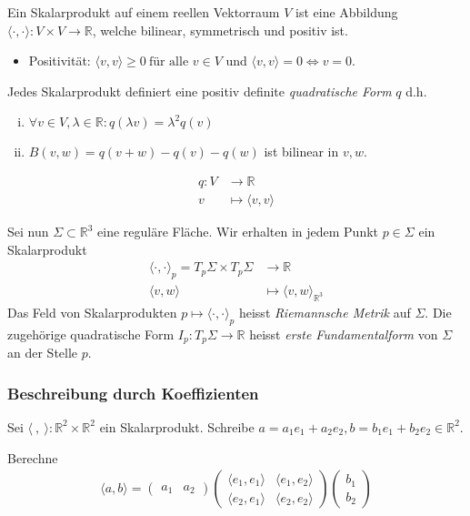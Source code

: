 \documentclass[../main.tex]{subfiles}
\begin{document}
\begin{recall}
Ein Skalarprodukt auf einem reellen Vektorraum $V$ ist eine Abbildung $\langle \cdot , \cdot \rangle : V \times V \to \mathbb{R}$, welche bilinear, symmetrisch und positiv ist.
\begin{itemize}
    \item Positivität: $\langle v, v \rangle \ge 0 \ \text{für alle } v \in V$ und $\langle v, v \rangle = 0 \iff v = 0$.
\end{itemize}
Jedes Skalarprodukt definiert eine positiv definite \emph{quadratische Form} $q$ d.h.
\begin{enumerate}[(i)]
    \item $\forall v \in V, \lambda \in \mathbb{R} : q(\lambda v) = \lambda ^2 q(v)$
    \item $B(v,w) = q(v+w) - q(v) - q(w)$ ist bilinear in $v,w$.
\end{enumerate}
\begin{align*}
    q : V & \to \mathbb{R} \\
    v & \mapsto \langle v,v \rangle 
\end{align*}
\end{recall}

Sei nun $ \Sigma \subset \mathbb{R}^3$ eine reguläre Fläche. Wir erhalten in jedem Punkt $p \in \Sigma$ ein Skalarprodukt
\begin{align*}
    \langle \cdot , \cdot \rangle _p = T_p \Sigma \times T_p \Sigma & \to \mathbb{R} \\
    \langle v, w \rangle & \mapsto \langle v, w \rangle _{\mathbb{R}^3}
\end{align*}
Das Feld von Skalarprodukten $p \mapsto \langle \cdot , \cdot \rangle _p $ heisst \emph{Riemannsche Metrik} auf $ \Sigma$. Die zugehörige quadratische Form $ I_p : T_p \Sigma \to \mathbb{R}$ heisst \emph{erste Fundamentalform} von $\Sigma$ an der Stelle $p$.
\subsubsection*{Beschreibung durch Koeffizienten}

Sei $\langle \ , \ \rangle : \mathbb{R}^2 \times \mathbb{R}^2$ ein Skalarprodukt.
Schreibe $a = a_1e_1 + a_2e_2, b = b_1e_1 + b_2e_2 \in \mathbb{R}^2$.

Berechne \begin{align*}
    \langle a, b \rangle = \begin{pmatrix}
        a_1 & a_2
    \end{pmatrix} \begin{pmatrix}
        \langle e_1, e_1 \rangle & \langle e_1, e_2 \rangle \\
        \langle e_2, e_1 \rangle & \langle e_2, e_2 \rangle
    \end{pmatrix} \begin{pmatrix}
        b_1 \\ b_2
    \end{pmatrix}
\end{align*}
\end{document}

